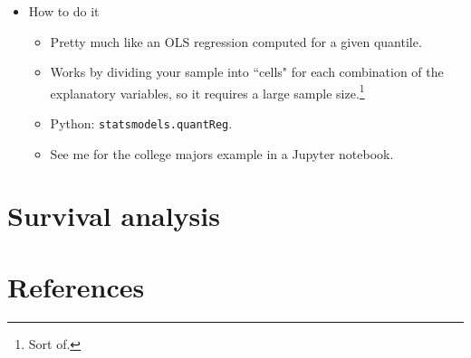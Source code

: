 \documentclass{beamer}
\begin{document}
\begin{frame}
	\begin{itemize}
		\item How to do it
		\begin{itemize}
			\item Pretty much like an OLS regression computed for a given quantile.
			\item Works by dividing your sample into ``cells" for each combination of the explanatory variables, so it requires a large sample size.\footnote{Sort of.}
			\item Python: \texttt{statsmodels.quantReg}.
			\item See me for the college majors example in a Jupyter notebook.
		\end{itemize}
	\end{itemize}
\end{frame}

\section{Survival analysis}



\section{References}

\begin{frame}[allowframebreaks]
        
        
\end{frame}
\end{document}
